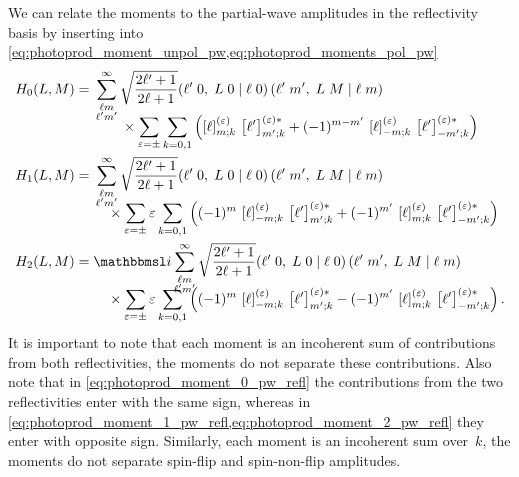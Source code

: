We can relate the moments to the partial-wave amplitudes in the
reflectivity basis by inserting
 into
\cref{eq:photoprod_moment_unpol_pw,eq:photoprod_moments_pol_pw}
\begin{align}
  \label{eq:photoprod_moment_0_pw_refl}
  H_0(L, M)
  ={}& \begin{multlined}[t][0.8\columnwidth]
    \sum_{\substack{\ell m \\ \ell' m'}}^\infty \sqrt{\frac{2 \ell' + 1}{2 \ell + 1}}
    \clebsch{\ell'}{0}{L}{0}{\ell}{0}\, \clebsch{\ell'}{m'}{L}{M}{\ell}{m} \\[-2ex]
    \shoveleft{\hfill \times%
      \sum_{\refl = \pm} \sum_{k = 0, 1} \rBrk[2]{\sBrk{\ell}^{(\refl)}_{m; k}\, \sBrk{\ell'}^{(\refl) *}_{m'; k}
      + (-1)^{m - m'}\, \sBrk{\ell}^{(\refl)}_{{-m}; k}\, \sBrk{\ell'}^{(\refl) *}_{{-m'}; k}}
    }
  \end{multlined}
  \\
  \label{eq:photoprod_moment_1_pw_refl}
  H_1(L, M)
  ={}& \begin{multlined}[t][0.8\columnwidth]
    \sum_{\substack{\ell m \\ \ell' m'}}^\infty \sqrt{\frac{2 \ell' + 1}{2 \ell + 1}}
    \clebsch{\ell'}{0}{L}{0}{\ell}{0}\, \clebsch{\ell'}{m'}{L}{M}{\ell}{m} \\[-2ex]
    \shoveleft{\hfill \times%
      \sum_{\refl = \pm} \refl \sum_{k = 0, 1} \rBrk[2]{(-1)^m\, \sBrk{\ell}^{(\refl)}_{{-m}; k}\, \sBrk{\ell'}^{(\refl) *}_{m'; k}
      + (-1)^{m'}\, \sBrk{\ell}^{(\refl)}_{m; k}\, \sBrk{\ell'}^{(\refl) *}_{{-m'}; k}}
    }
  \end{multlined}
  \\
  \label{eq:photoprod_moment_2_pw_refl}
  H_2(L, M)
  ={}& \begin{multlined}[t][0.8\columnwidth]
    \imag \sum_{\substack{\ell m \\ \ell' m'}}^\infty \sqrt{\frac{2 \ell' + 1}{2 \ell + 1}}
    \clebsch{\ell'}{0}{L}{0}{\ell}{0}\, \clebsch{\ell'}{m'}{L}{M}{\ell}{m} \\[-2ex]
    \shoveleft{\hfill \times%
      \sum_{\refl = \pm} \refl \sum_{k = 0, 1} \rBrk[2]{(-1)^m\, \sBrk{\ell}^{(\refl)}_{{-m}; k}\, \sBrk{\ell'}^{(\refl) *}_{m'; k}
      - (-1)^{m'}\, \sBrk{\ell}^{(\refl)}_{m; k}\, \sBrk{\ell'}^{(\refl) *}_{{-m'}; k}}
    }.
  \end{multlined}
\end{align}
It is important to note that each moment is an incoherent sum of
contributions from both reflectivities, \ie the moments do not
separate these contributions.  Also note that in
\cref{eq:photoprod_moment_0_pw_refl} the contributions from the two
reflectivities enter with the same sign, whereas in
\cref{eq:photoprod_moment_1_pw_refl,eq:photoprod_moment_2_pw_refl}
they enter with opposite sign.  Similarly, each moment is an
incoherent sum over~$k$, \ie the moments do not separate spin-flip and
spin-non-flip amplitudes.

